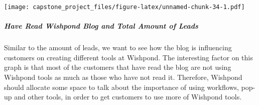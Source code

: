 \documentclass[]{article}
\newenvironment{Shaded}{\begin{snugshade}}{\end{snugshade}}
\newcommand{\KeywordTok}[1]{\textcolor[rgb]{0.13,0.29,0.53}{\textbf{#1}}}
\newcommand{\DataTypeTok}[1]{\textcolor[rgb]{0.13,0.29,0.53}{#1}}
\newcommand{\DecValTok}[1]{\textcolor[rgb]{0.00,0.00,0.81}{#1}}
\newcommand{\StringTok}[1]{\textcolor[rgb]{0.31,0.60,0.02}{#1}}
\newcommand{\OperatorTok}[1]{\textcolor[rgb]{0.81,0.36,0.00}{\textbf{#1}}}
\newcommand{\NormalTok}[1]{#1}
\let\oldsubparagraph\subparagraph
\renewcommand{\subparagraph}[1]{\oldsubparagraph{#1}\mbox{}}
\begin{document}
\begin{Shaded}
\end{Shaded}

\texttt{[image: capstone\_project\_files/figure-latex/unnamed-chunk-34-1.pdf]}

\subparagraph{Have Read Wishpond Blog and Total Amount of
Leads}\label{have-read-wishpond-blog-and-total-amount-of-leads-1}

Similar to the amount of leads, we want to see how the blog is
influencing customers on creating different tools at Wishpond. The
interesting factor on this graph is that most of the customers that have
read the blog are not using Wishpond tools as much as those who have not
read it. Therefore, Wishpond should allocate some space to talk about
the importance of using workflows, pop-up and other tools, in order to
get customers to use more of Wishpond tools.

\begin{Shaded}
\end{Shaded}
\end{document}
